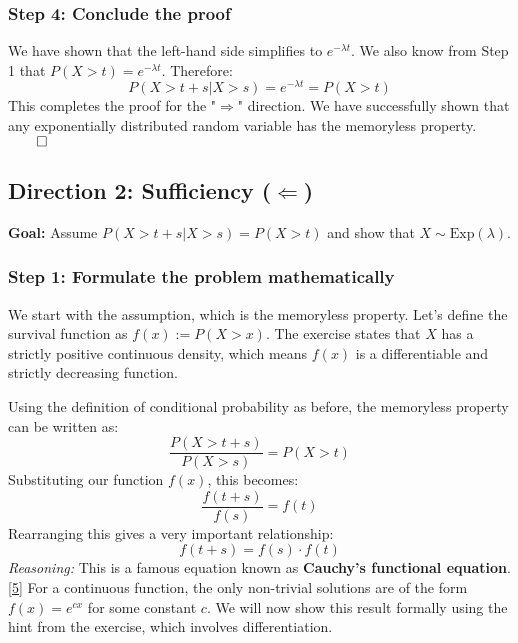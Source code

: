 \documentclass[11pt,a4paper]{article}
\begin{document}
\subsubsection*{Step 4: Conclude the proof}
We have shown that the left-hand side simplifies to $e^{-\lambda t}$. We also know from Step 1 that $P(X > t) = e^{-\lambda t}$. Therefore:
\[ P(X > t + s | X > s) = e^{-\lambda t} = P(X > t) \]
This completes the proof for the "$\Rightarrow$" direction. We have successfully shown that any exponentially distributed random variable has the memoryless property. $\qed$

\subsection{Direction 2: Sufficiency ($\Leftarrow$)}

\noindent \textbf{Goal:} Assume $P(X > t + s | X > s) = P(X > t)$ and show that $X \sim \text{Exp}(\lambda)$.

\subsubsection*{Step 1: Formulate the problem mathematically}
We start with the assumption, which is the memoryless property. Let's define the survival function as $f(x) := P(X > x)$. The exercise states that $X$ has a strictly positive continuous density, which means $f(x)$ is a differentiable and strictly decreasing function.

Using the definition of conditional probability as before, the memoryless property can be written as:
\[ \frac{P(X > t+s)}{P(X > s)} = P(X > t) \]
Substituting our function $f(x)$, this becomes:
\[ \frac{f(t+s)}{f(s)} = f(t) \]
Rearranging this gives a very important relationship:
\[ f(t+s) = f(s) \cdot f(t) \]
\textit{Reasoning:} This is a famous equation known as \textbf{Cauchy's functional equation}. \hyperlink{note:cauchy}{[5]} For a continuous function, the only non-trivial solutions are of the form $f(x) = e^{cx}$ for some constant $c$. We will now show this result formally using the hint from the exercise, which involves differentiation.
\end{document}
